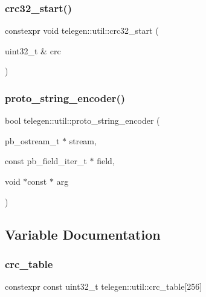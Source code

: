 \mbox{\label{namespacetelegen_1_1util_ae8b96d2bcf704fd8de4366ea725b54f7}} 
\subsubsection{\texorpdfstring{crc32\+\_\+start()}{crc32\_start()}}
{\footnotesize\ttfamily constexpr void telegen\+::util\+::crc32\+\_\+start (\begin{DoxyParamCaption}\item[{uint32\+\_\+t \&}]{crc }\end{DoxyParamCaption})}

\mbox{\label{namespacetelegen_1_1util_ad9294f759196bd321f5566036af85bf2}} 
\subsubsection{\texorpdfstring{proto\+\_\+string\+\_\+encoder()}{proto\_string\_encoder()}}
{\footnotesize\ttfamily bool telegen\+::util\+::proto\+\_\+string\+\_\+encoder (\begin{DoxyParamCaption}\item[{pb\+\_\+ostream\+\_\+t $\ast$}]{stream,  }\item[{const pb\+\_\+field\+\_\+iter\+\_\+t $\ast$}]{field,  }\item[{void $\ast$const $\ast$}]{arg }\end{DoxyParamCaption})\hspace{0.3cm}{\ttfamily [inline]}}



\subsection{Variable Documentation}
\mbox{\label{namespacetelegen_1_1util_acf354c2c0ec545191120b1f8628cb7d2}} 
\subsubsection{\texorpdfstring{crc\+\_\+table}{crc\_table}}
{\footnotesize\ttfamily constexpr const uint32\+\_\+t telegen\+::util\+::crc\+\_\+table\mbox{[}256\mbox{]}}

